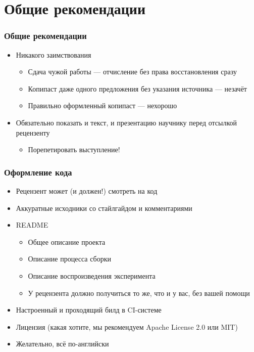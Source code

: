 \documentclass[xetex,mathserif,serif]{beamer}
\begin{document}
    \section{Общие рекомендации}

    \begin{frame}
        \frametitle{Общие рекомендации}
        \begin{itemize}
            \item Никакого заимствования 
            \begin{itemize}
                \item Сдача чужой работы --- отчисление без права восстановления сразу
                \item Копипаст даже одного предложения без указания источника --- незачёт
                \item Правильно оформленный копипаст --- нехорошо
            \end{itemize}
            \item Обязательно показать и текст, и презентацию научнику перед отсылкой рецензенту
            \begin{itemize}
                \item Порепетировать выступление!
            \end{itemize}
        \end{itemize}
    \end{frame}

    \begin{frame}
        \frametitle{Оформление кода}
        \begin{itemize}
            \item Рецензент может (и должен!) смотреть на код
            \item Аккуратные исходники со стайлгайдом и комментариями
            \item README 
            \begin{itemize}
                \item Общее описание проекта
                \item Описание процесса сборки
                \item Описание воспроизведения эксперимента
                \item У рецензента должно получиться то же, что и у вас, без вашей помощи
            \end{itemize}
            \item Настроенный и проходящий билд в CI-системе
            \item Лицензия (какая хотите, мы рекомендуем Apache License 2.0 или MIT)
            \item Желательно, всё по-английски
        \end{itemize}
    \end{frame}
\end{document}
